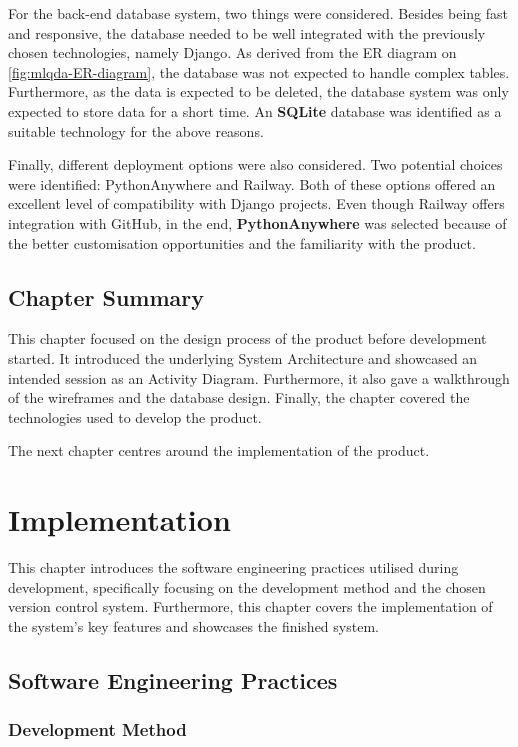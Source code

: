 \documentclass{l4proj}
\begin{document}
For the back-end database system, two things were considered. Besides being fast and responsive, the database needed to be well integrated with the previously chosen technologies, namely Django. As derived from the ER diagram on \ref{fig:mlqda-ER-diagram}, the database was not expected to handle complex tables. Furthermore, as the data is expected to be deleted, the database system was only expected to store data for a short time. An \textbf{SQLite} database was identified as a suitable technology for the above reasons.

Finally, different deployment options were also considered. Two potential choices were identified: PythonAnywhere and Railway. Both of these options offered an excellent level of compatibility with Django projects. Even though Railway offers integration with GitHub, in the end, \textbf{PythonAnywhere} was selected because of the better customisation opportunities and the familiarity with the product.

\section{Chapter Summary}
This chapter focused on the design process of the product before development started. It introduced the underlying System Architecture and showcased an intended session as an Activity Diagram. Furthermore, it also gave a walkthrough of the wireframes and the database design. Finally, the chapter covered the technologies used to develop the product.

The next chapter centres around the implementation of the product.

\chapter{Implementation}
This chapter introduces the software engineering practices utilised during development, specifically focusing on the development method and the chosen version control system. Furthermore, this chapter covers the implementation of the system's key features and showcases the finished system.

\section{Software Engineering Practices}
\subsection{Development Method}
\end{document}
